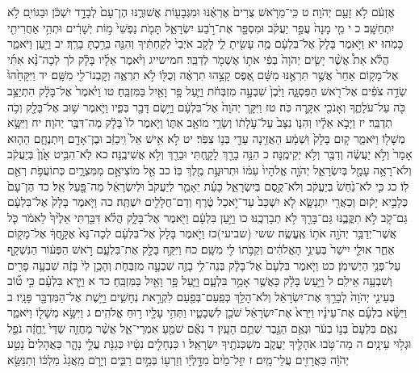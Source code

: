 \documentclass[twoside, openany, parskip=half, 11pt]{book}
\begin{document}
אֶזְעֹ֔ם לֹ֥א זָעַ֖ם יְהֹוָה׃ ט כִּֽי־מֵרֹ֤אשׁ צֻרִים֙ אֶרְאֶ֔נּוּ וּמִגְּבָע֖וֹת אֲשׁוּרֶ֑נּוּ הֶן־עָם֙ לְבָדָ֣ד יִשְׁכֹּ֔ן וּבַגּוֹיִ֖ם לֹ֥א יִתְחַשָּֽׁב׃ כ י מִ֤י מָנָה֙ עֲפַ֣ר יַעֲקֹ֔ב וּמִסְפָּ֖ר אֶת־רֹ֣בַע יִשְׂרָאֵ֑ל תָּמֹ֤ת נַפְשִׁי֙ מ֣וֹת יְשָׁרִ֔ים וּתְהִ֥י אַחֲרִיתִ֖י כָּמֹֽהוּ׃ יא וַיֹּ֤אמֶר בָּלָק֙ אֶל־בִּלְעָ֔ם מֶ֥ה עָשִׂ֖יתָ לִ֑י לָקֹ֤ב אֹיְבַי֙ לְקַחְתִּ֔יךָ וְהִנֵּ֖ה בֵּרַ֥כְתָּ בָרֵֽךְ׃ יב וַיַּ֖עַן וַיֹּאמַ֑ר הֲלֹ֗א אֵת֩ אֲשֶׁ֨ר יָשִׂ֤ים יְהֹוָה֙ בְּפִ֔י אֹת֥וֹ אֶשְׁמֹ֖ר לְדַבֵּֽר׃ חמישייג וַיֹּ֨אמֶר אֵלָ֜יו בָּלָ֗ק לך לְכָה־נָּ֨א אִתִּ֜י אֶל־מָק֤וֹם אַחֵר֙ אֲשֶׁ֣ר תִּרְאֶ֣נּוּ מִשָּׁ֔ם אֶ֚פֶס קָצֵ֣הוּ תִרְאֶ֔ה וְכֻלּ֖וֹ לֹ֣א תִרְאֶ֑ה וְקׇבְנוֹ־לִ֖י מִשָּֽׁם׃ יד וַיִּקָּחֵ֙הוּ֙ שְׂדֵ֣ה צֹפִ֔ים אֶל־רֹ֖אשׁ הַפִּסְגָּ֑ה וַיִּ֙בֶן֙ שִׁבְעָ֣ה מִזְבְּחֹ֔ת וַיַּ֛עַל פָּ֥ר וָאַ֖יִל בַּמִּזְבֵּֽחַ׃ טו וַיֹּ֙אמֶר֙ אֶל־בָּלָ֔ק הִתְיַצֵּ֥ב כֹּ֖ה עַל־עֹלָתֶ֑ךָ וְאָנֹכִ֖י אִקָּ֥רֶה כֹּֽה׃ טז וַיִּקָּ֤ר יְהֹוָה֙ אֶל־בִּלְעָ֔ם וַיָּ֥שֶׂם דָּבָ֖ר בְּפִ֑יו וַיֹּ֛אמֶר שׁ֥וּב אֶל־בָּלָ֖ק וְכֹ֥ה תְדַבֵּֽר׃ יז וַיָּבֹ֣א אֵלָ֗יו וְהִנּ֤וֹ נִצָּב֙ עַל־עֹ֣לָת֔וֹ וְשָׂרֵ֥י מוֹאָ֖ב אִתּ֑וֹ וַיֹּ֤אמֶר לוֹ֙ בָּלָ֔ק מַה־דִּבֶּ֖ר יְהֹוָה׃ יח וַיִּשָּׂ֥א מְשָׁל֖וֹ וַיֹּאמַ֑ר ק֤וּם בָּלָק֙ וּֽשְׁמָ֔ע הַאֲזִ֥ינָה עָדַ֖י בְּנ֥וֹ צִפֹּֽר׃ יט לֹ֣א אִ֥ישׁ אֵל֙ וִֽיכַזֵּ֔ב וּבֶן־אָדָ֖ם וְיִתְנֶחָ֑ם הַה֤וּא אָמַר֙ וְלֹ֣א יַעֲשֶׂ֔ה וְדִבֶּ֖ר וְלֹ֥א יְקִימֶֽנָּה׃ כ הִנֵּ֥ה בָרֵ֖ךְ לָקָ֑חְתִּי וּבֵרֵ֖ךְ וְלֹ֥א אֲשִׁיבֶֽנָּה׃ כא לֹֽא־הִבִּ֥יט אָ֙וֶן֙ בְּיַעֲקֹ֔ב וְלֹא־רָאָ֥ה עָמָ֖ל בְּיִשְׂרָאֵ֑ל יְהֹוָ֤ה אֱלֹהָיו֙ עִמּ֔וֹ וּתְרוּעַ֥ת מֶ֖לֶךְ בּֽוֹ׃ כב אֵ֖ל מוֹצִיאָ֣ם מִמִּצְרָ֑יִם כְּתוֹעֲפֹ֥ת רְאֵ֖ם לֽוֹ׃ כג כִּ֤י לֹא־נַ֙חַשׁ֙ בְּיַעֲקֹ֔ב וְלֹא־קֶ֖סֶם בְּיִשְׂרָאֵ֑ל כָּעֵ֗ת יֵאָמֵ֤ר לְיַעֲקֹב֙ וּלְיִשְׂרָאֵ֔ל מַה־פָּ֖עַל אֵֽל׃ כד הֶן־עָם֙ כְּלָבִ֣יא יָק֔וּם וְכַאֲרִ֖י יִתְנַשָּׂ֑א לֹ֤א יִשְׁכַּב֙ עַד־יֹ֣אכַל טֶ֔רֶף וְדַם־חֲלָלִ֖ים יִשְׁתֶּֽה׃ כה וַיֹּ֤אמֶר בָּלָק֙ אֶל־בִּלְעָ֔ם גַּם־קֹ֖ב לֹ֣א תִקֳּבֶ֑נּוּ גַּם־בָּרֵ֖ךְ לֹ֥א תְבָרְכֶֽנּוּ׃ כו וַיַּ֣עַן בִּלְעָ֔ם וַיֹּ֖אמֶר אֶל־בָּלָ֑ק הֲלֹ֗א דִּבַּ֤רְתִּי אֵלֶ֙יךָ֙ לֵאמֹ֔ר כֹּ֛ל אֲשֶׁר־יְדַבֵּ֥ר יְהֹוָ֖ה אֹת֥וֹ אֶֽעֱשֶֽׂה׃ ששי (שביעי)כז וַיֹּ֤אמֶר בָּלָק֙ אֶל־בִּלְעָ֔ם לְכָה־נָּא֙ אֶקָּ֣חֲךָ֔ אֶל־מָק֖וֹם אַחֵ֑ר אוּלַ֤י יִישַׁר֙ בְּעֵינֵ֣י הָאֱלֹהִ֔ים וְקַבֹּ֥תוֹ לִ֖י מִשָּֽׁם׃ כח וַיִּקַּ֥ח בָּלָ֖ק אֶת־בִּלְעָ֑ם רֹ֣אשׁ הַפְּע֔וֹר הַנִּשְׁקָ֖ף עַל־פְּנֵ֥י הַיְשִׁימֹֽן׃ כט וַיֹּ֤אמֶר בִּלְעָם֙ אֶל־בָּלָ֔ק בְּנֵה־לִ֥י בָזֶ֖ה שִׁבְעָ֣ה מִזְבְּחֹ֑ת וְהָכֵ֥ן לִי֙ בָּזֶ֔ה שִׁבְעָ֥ה פָרִ֖ים וְשִׁבְעָ֥ה אֵילִֽם׃ ל וַיַּ֣עַשׂ בָּלָ֔ק כַּאֲשֶׁ֖ר אָמַ֣ר בִּלְעָ֑ם וַיַּ֛עַל פָּ֥ר וָאַ֖יִל בַּמִּזְבֵּֽחַ׃ כד א וַיַּ֣רְא בִּלְעָ֗ם כִּ֣י ט֞וֹב בְּעֵינֵ֤י יְהֹוָה֙ לְבָרֵ֣ךְ אֶת־יִשְׂרָאֵ֔ל וְלֹא־הָלַ֥ךְ כְּפַֽעַם־בְּפַ֖עַם לִקְרַ֣את נְחָשִׁ֑ים וַיָּ֥שֶׁת אֶל־הַמִּדְבָּ֖ר פָּנָֽיו׃ ב וַיִּשָּׂ֨א בִלְעָ֜ם אֶת־עֵינָ֗יו וַיַּרְא֙ אֶת־יִשְׂרָאֵ֔ל שֹׁכֵ֖ן לִשְׁבָטָ֑יו וַתְּהִ֥י עָלָ֖יו ר֥וּחַ אֱלֹהִֽים׃ ג וַיִּשָּׂ֥א מְשָׁל֖וֹ וַיֹּאמַ֑ר נְאֻ֤ם בִּלְעָם֙ בְּנ֣וֹ בְעֹ֔ר וּנְאֻ֥ם הַגֶּ֖בֶר שְׁתֻ֥ם הָעָֽיִן׃ ד נְאֻ֕ם שֹׁמֵ֖עַ אִמְרֵי־אֵ֑ל אֲשֶׁ֨ר מַחֲזֵ֤ה שַׁדַּי֙ יֶֽחֱזֶ֔ה נֹפֵ֖ל וּגְל֥וּי עֵינָֽיִם׃ ה מַה־טֹּ֥בוּ אֹהָלֶ֖יךָ יַעֲקֹ֑ב מִשְׁכְּנֹתֶ֖יךָ יִשְׂרָאֵֽל׃ ו כִּנְחָלִ֣ים נִטָּ֔יוּ כְּגַנֹּ֖ת עֲלֵ֣י נָהָ֑ר כַּאֲהָלִים֙ נָטַ֣ע יְהֹוָ֔ה כַּאֲרָזִ֖ים עֲלֵי־מָֽיִם׃ ז יִֽזַּל־מַ֙יִם֙ מִדָּ֣לְיָ֔ו וְזַרְע֖וֹ בְּמַ֣יִם רַבִּ֑ים וְיָרֹ֤ם מֵֽאֲגַג֙ מַלְכּ֔וֹ וְתִנַּשֵּׂ֖א 
\end{document}
